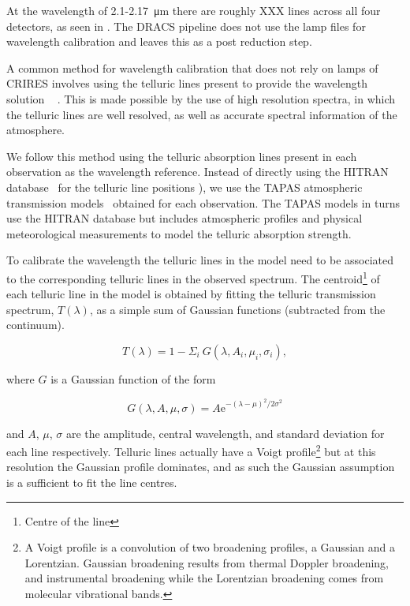 At the wavelength of 2.1-2.17~\si{\micro\meter} there are roughly XXX \thar{} lines across all four detectors, as seen in .
The DRACS pipeline does not use the \thar{} lamp files for wavelength calibration and leaves this as a post reduction step.

A common method for wavelength calibration that does not rely on \thar{} lamps of CRIRES involves using the telluric lines present to provide the wavelength solution ~\citep[e.g.][]{brogi_signature_2012,brogi_carbon_2014,dekok_detection_2013}{\red{} \citep{ piskorz_evidence_2016}}. This is made possible by the use of high resolution spectra, in which the telluric lines are well resolved, as well as accurate spectral information of the atmosphere.

We follow this method using the telluric absorption lines present in each observation as the wavelength reference. Instead of directly using the HITRAN database~\citep{rothman_hitran2012_2013} for the telluric line positions \citet[such as in ][]{brogi_signature_2012,brogi_carbon_2014,dekok_detection_2013}), we use the TAPAS atmospheric transmission models~\citep{bertaux_tapas_2014} obtained for each observation. The TAPAS models in turns use the HITRAN database but includes atmospheric profiles and physical meteorological measurements to model the telluric absorption strength.

To calibrate the wavelength the telluric lines in the model need to be associated to the corresponding telluric lines in the observed spectrum. The centroid\footnote{Centre of the line} of each telluric line in the model is obtained by fitting the telluric transmission spectrum, \(T(\lambda) \), as a simple sum of Gaussian functions (subtracted from the continuum).

\begin{equation}
T(\lambda) = 1 - {\Sigma}_{i}\ G(\lambda, A_{i}, {\mu}_{i}, {\sigma}_{i}),
\end{equation}

where \(G \) is a Gaussian function of the form

\begin{equation}
G(\lambda, A, \mu, \sigma) = {A \textrm{e}}^{{-(\lambda-\mu)}^{2}/2\sigma^{2}}
\end{equation}

and \(A \), \(\mu \), \(\sigma \) are the amplitude, central wavelength, and standard deviation for each line respectively. Telluric lines actually have a Voigt profile\footnote{A Voigt profile is a convolution of two broadening profiles, a Gaussian and a Lorentzian. Gaussian broadening results from thermal Doppler broadening, and instrumental broadening while the Lorentzian broadening comes from molecular vibrational bands\citep{meier_art_2005}.} but at this resolution the Gaussian profile dominates, and as such the Gaussian assumption is a sufficient to fit the line centres.

